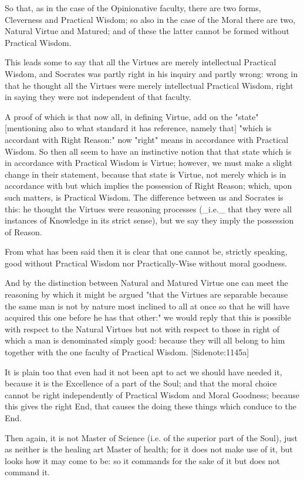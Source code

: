 So that, as in the case of the Opinionative faculty, there are two
forms, Cleverness and Practical Wisdom; so also in the case of the Moral
there are two, Natural Virtue and Matured; and of these the latter
cannot be formed without Practical Wisdom.

This leads some to say that all the Virtues are merely intellectual
Practical Wisdom, and Socrates was partly right in his inquiry and
partly wrong: wrong in that he thought all the Virtues were merely
intellectual Practical Wisdom, right in saying they were not independent
of that faculty.

A proof of which is that now all, in defining Virtue, add on the "state"
[mentioning also to what standard it has reference, namely that] "which
is accordant with Right Reason:" now "right" means in accordance with
Practical Wisdom. So then all seem to have an instinctive notion that
that state which is in accordance with Practical Wisdom is Virtue;
however, we must make a slight change in their statement, because that
state is Virtue, not merely which is in accordance with but which
implies the possession of Right Reason; which, upon such matters, is
Practical Wisdom. The difference between us and Socrates is this: he
thought the Virtues were reasoning processes (_i.e._ that they were all
instances of Knowledge in its strict sense), but we say they imply the
possession of Reason.

From what has been said then it is clear that one cannot be, strictly
speaking, good without Practical Wisdom nor Practically-Wise without
moral goodness.

And by the distinction between Natural and Matured Virtue one can
meet the reasoning by which it might be argued "that the Virtues are
separable because the same man is not by nature most inclined to all at
once so that he will have acquired this one before he has that other:"
we would reply that this is possible with respect to the Natural Virtues
but not with respect to those in right of which a man is denominated
simply good: because they will all belong to him together with the one
faculty of Practical Wisdom. [Sidenote:1145a]

It is plain too that even had it not been apt to act we should have
needed it, because it is the Excellence of a part of the Soul; and that
the moral choice cannot be right independently of Practical Wisdom and
Moral Goodness; because this gives the right End, that causes the doing
these things which conduce to the End.

Then again, it is not Master of Science (i.e. of the superior part of
the Soul), just as neither is the healing art Master of health; for it
does not make use of it, but looks how it may come to be: so it commands
for the sake of it but does not command it.

